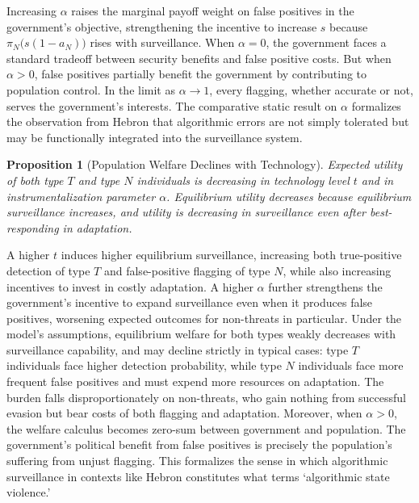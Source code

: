\documentclass[11pt,a4paper]{article}
\newtheorem{proposition}{Proposition}
\theoremstyle{definition}
\theoremstyle{remark}
\theoremstyle{definition}
\begin{document}
Increasing $\alpha$ raises the marginal payoff weight on false positives in the government's objective, strengthening the incentive to increase 
$s$ because $\pi_N\!\big(s(1-a_N)\big)$ rises with surveillance. When $\alpha = 0$, the government faces a standard tradeoff between security 
benefits and false positive costs. But when $\alpha > 0$, false positives partially benefit the government by contributing to population control. 
In the limit as $\alpha \to 1$, every flagging, whether accurate or not, serves the government's interests. The comparative static result on 
$\alpha$ formalizes the observation from Hebron that algorithmic errors are not simply tolerated but may be functionally integrated into the 
surveillance system.

\begin{proposition}[Population Welfare Declines with Technology]
Expected utility of both type $T$ and type $N$ individuals is decreasing in technology level $t$ and in instrumentalization parameter $\alpha$.
Equilibrium utility decreases because equilibrium surveillance increases, and utility is decreasing in surveillance even after best-responding in adaptation.
\end{proposition}

A higher $t$ induces higher equilibrium surveillance, increasing both true-positive detection of type $T$ and false-positive flagging of type 
$N$, while also increasing incentives to invest in costly adaptation. A higher $\alpha$ further strengthens the government's incentive to expand 
surveillance even when it produces false positives, worsening expected outcomes for non-threats in particular. Under the model's assumptions, 
equilibrium welfare for both types weakly decreases with surveillance capability, and may decline strictly in typical cases: 
type $T$ individuals face higher detection probability, while type $N$ individuals face more frequent false positives and 
must expend more resources on adaptation. The burden falls disproportionately on non-threats, who gain nothing from successful evasion but bear 
costs of both flagging and adaptation. Moreover, when $\alpha > 0$, the welfare calculus becomes zero-sum between government and population. 
The government's political benefit from false positives is precisely the population's suffering from unjust flagging. This formalizes the sense 
in which algorithmic surveillance in contexts like Hebron constitutes what \citet{goodfriend2023algorithmic} terms `algorithmic state violence.'

\end{document}
